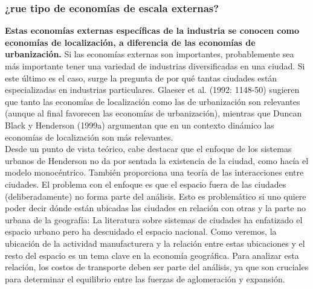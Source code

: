 \subsubsection{¿rue tipo de economías de escala externas?}
\textbf{Estas economías externas específicas de la industria se conocen como economías de localización, a diferencia de las economías de urbanización.} Si las economías externas son importantes, probablemente sea más importante tener una variedad de industrias diversificadas en una ciudad. Si este último es el caso, surge la pregunta de por qué tantas ciudades están especializadas en industrias particulares. Glaeser et al. (1992: 1148-50) sugieren que tanto las economías de localización como las de urbanización son relevantes (aunque al final favorecen las economías de urbanización), mientras que Duncan Black y Henderson (1999a) argumentan que en un contexto dinámico las economías de localización son más relevantes.\\
Desde un punto de vista teórico, cabe destacar que el enfoque de los sistemas urbanos de Henderson no da por sentada la existencia de la ciudad, como hacía el modelo monocéntrico. También proporciona una teoría de las interacciones entre ciudades. El problema con el enfoque es que el espacio fuera de las ciudades (deliberadamente) no forma parte del análisis. Esto es problemático si uno quiere poder decir dónde están ubicadas las ciudades en relación con otras y la parte no urbana de la geografía: La literatura sobre sistemas de ciudades ha enfatizado el espacio urbano pero ha descuidado el espacio nacional. Como veremos, la ubicación de la actividad manufacturera y la relación entre estas ubicaciones y el resto del espacio es un tema clave en la economía geográfica. Para analizar esta relación, los costos de transporte deben ser parte del análisis, ya que son cruciales para determinar el equilibrio entre las fuerzas de aglomeración y expansión. \\
